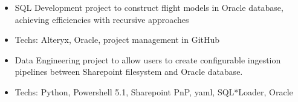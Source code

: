\documentclass[10pt,a4paper]{altacv}
\begin{document}
\begin{itemize}
  \item \small{SQL Development project to construct flight models in Oracle database, achieving efficiencies with recursive approaches}
  \item Techs: Alteryx, Oracle, project management in GitHub
\end{itemize}

\divider


\begin{itemize}
  \item \small{Data Engineering project to allow users to create configurable ingestion pipelines between Sharepoint filesystem and Oracle database.}
  \item Techs: Python, Powershell 5.1, Sharepoint PnP, yaml, SQL*Loader, Oracle
\end{itemize}




%
%
%

%


%










\end{document}

